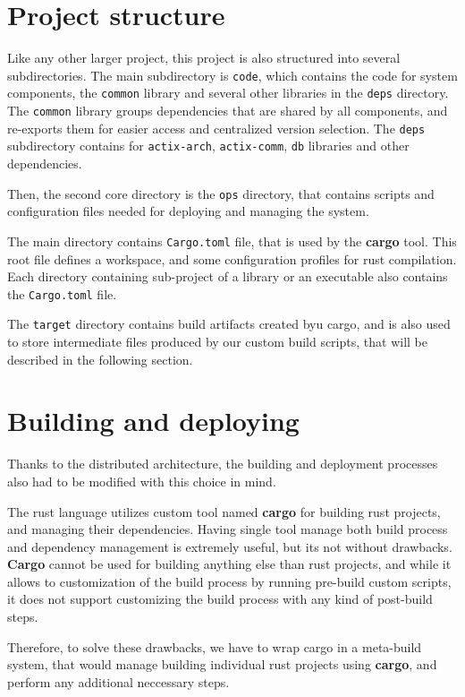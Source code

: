\section{Project structure}
Like any other larger project, this project is also structured into several subdirectories. The main subdirectory is \verb|code|,
which contains the code for system components, the \verb|common| library and several other
libraries in the \verb|deps| directory. The \verb|common| library groups dependencies that
are shared by all components, and re-exports them for easier access and centralized version selection. The \verb|deps| subdirectory contains
for \verb|actix-arch|, \verb|actix-comm|, \verb|db| libraries and other dependencies.

Then, the second core directory is the \verb|ops| directory, that contains scripts and configuration files
needed for deploying and managing the system.

The main directory contains \verb|Cargo.toml| file, that is used by the \textbf{cargo} tool. This root file
defines a workspace, and some configuration profiles for rust compilation. Each directory containing sub-project of
a library or an executable also contains the \verb|Cargo.toml| file.

The \verb|target| directory contains build artifacts created byu cargo, and is also used to store intermediate files produced by our custom build scripts, that
will be described in the following section.

\section{Building and deploying}
Thanks to the distributed architecture, the building and deployment processes also had to be modified with this choice in mind.

The rust language utilizes custom tool named \textbf{cargo} for building rust projects, and managing their dependencies.
Having single tool manage both build process and dependency management is extremely useful, but its not without drawbacks.
\textbf{Cargo} cannot be used for building anything else than rust projects, and while it allows to customization
of the build process by running pre-build custom scripts, it does not support customizing the build process with
any kind of post-build steps.

Therefore, to solve these drawbacks, we have to wrap cargo in a meta-build system, that would manage building
individual rust projects using \textbf{cargo}, and perform any  additional neccessary steps.

